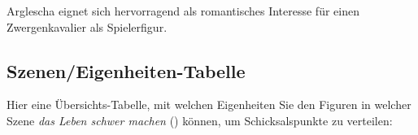 Arglescha eignet sich hervorragend als romantisches Interesse für einen Zwergenkavalier als Spielerfigur.

\spaltenende
\begin{center}
\end{center}

\newpage
\subsection{Szenen/Eigenheiten-Tabelle}
Hier eine Übersichts-Tabelle, mit welchen Eigenheiten Sie den Figuren in welcher Szene \emph{das Leben schwer machen} () können, um Schicksalspunkte zu verteilen:

